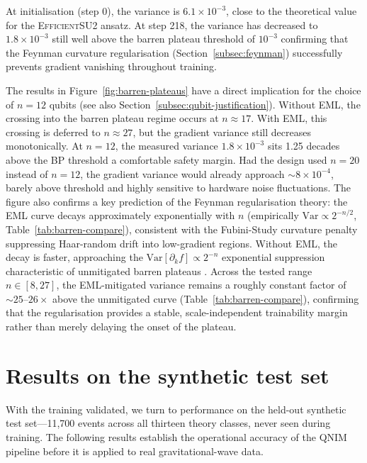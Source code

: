 \documentclass[11pt,a4paper, english]{book}
\theoremstyle{plain}
\theoremstyle{definition}
\numberwithin{equation}{chapter}
\numberwithin{figure}{chapter}
\numberwithin{table}{chapter}
\begin{document}
At initialisation (step 0), the variance
is $6.1\times10^{-3}$, close to the theoretical value for the
\textsc{EfficientSU2} ansatz.  At step 218, the variance has decreased
to $1.8\times10^{-3}$  still well above the barren plateau threshold
of $10^{-3}$  confirming that the Feynman curvature regularisation
(Section~\ref{subsec:feynman}) successfully prevents gradient vanishing
throughout training.

The results in Figure~\ref{fig:barren-plateaus} have a direct
implication for the choice of $n = 12$ qubits (see also
Section~\ref{subsec:qubit-justification}).  Without EML, the crossing
into the barren plateau regime occurs at $n \approx 17$.  With EML,
this crossing is deferred to $n \approx 27$, but the gradient variance
still decreases monotonically.  At $n = 12$, the measured variance
$1.8\times10^{-3}$ sits 1.25 decades above the BP threshold  a
comfortable safety margin.  Had the design used $n = 20$ instead of
$n = 12$, the gradient variance would already approach
$\sim\!8\times10^{-4}$, barely above threshold and highly sensitive to
hardware noise fluctuations.  The figure also confirms a key prediction of the Feynman regularisation
theory: the EML curve decays approximately exponentially with $n$
(empirically $\mathrm{Var}\propto2^{-n/2}$, Table~\ref{tab:barren-compare}),
consistent with the Fubini-Study curvature penalty suppressing
Haar-random drift into low-gradient regions.  Without EML, the decay is
faster, approaching the $\mathrm{Var}[\partial_k f]\propto2^{-n}$
exponential suppression characteristic of unmitigated barren plateaus
\cite{McClean_2018_barren}.  Across the tested range $n\in[8,27]$, the
EML-mitigated variance remains a roughly constant factor of
$\sim\!25$--$26\times$ above the unmitigated curve
(Table~\ref{tab:barren-compare}), confirming that the regularisation
provides a stable, scale-independent trainability margin rather than
merely delaying the onset of the plateau.

\section{Results on the synthetic test set}
\label{sec:synthetic-results}

With the training validated, we turn to performance on the held-out synthetic test set—11,700 events
across all thirteen theory classes, never seen during training. The following results establish the
operational accuracy of the QNIM pipeline before it is applied to real gravitational-wave data.
\end{document}
